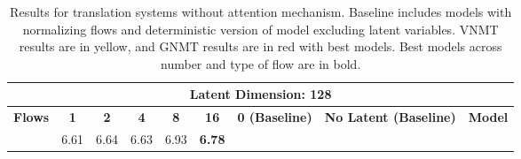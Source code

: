 \begin{table}[]
	\caption{Results for translation systems without attention mechanism. Baseline includes models with normalizing flows and deterministic version of model excluding latent variables. \ac{VNMT} results are in yellow, and \ac{GNMT} results are in red with best models.  Best models across number and type of flow are in bold.%
		}
	\label{tab:de_en_no_attention}
	
	\begin{tabular}{llllllccl}
		\multicolumn{9}{c}{\textbf{Latent Dimension: 128}}                                                                                                                                                                                                                                                                                                                                                                                                                                                                                                                             \\ \hline
		\multicolumn{1}{|c|}{\textbf{Flows}}                 & \multicolumn{1}{c|}{\textbf{1}}                            & \multicolumn{1}{c|}{\textbf{2}}                   & \multicolumn{1}{c|}{\textbf{4}}                   & \multicolumn{1}{c|}{\textbf{8}}                   & \multicolumn{1}{c|}{\textbf{16}}                           & \multicolumn{1}{c|}{\textbf{0 (Baseline)}}                                   & \multicolumn{1}{c|}{\textbf{No Latent (Baseline)}}                  & \multicolumn{1}{c|}{\textbf{Model}}                                          \\ \hline
		\rowcolor[HTML]{F9F9E1} 
		\multicolumn{1}{|l|}{\cellcolor[HTML]{F9F9E1}Planar} & \multicolumn{1}{l|}{\cellcolor[HTML]{F9F9E1}6.61}          & \multicolumn{1}{l|}{\cellcolor[HTML]{F9F9E1}6.64} & \multicolumn{1}{l|}{\cellcolor[HTML]{F9F9E1}6.63} & \multicolumn{1}{l|}{\cellcolor[HTML]{F9F9E1}6.93} & \multicolumn{1}{l|}{\cellcolor[HTML]{F9F9E1}\textbf{6.78}} & \multicolumn{1}{c|}{\cellcolor[HTML]{F9F9E1}}                                & \multicolumn{1}{c|}{\cellcolor[HTML]{F9F9E1}}                       & \multicolumn{1}{l|}{\cellcolor[HTML]{F9F9E1}}                                \\ \cline{1-6}

\end{tabular}
\end{table}
